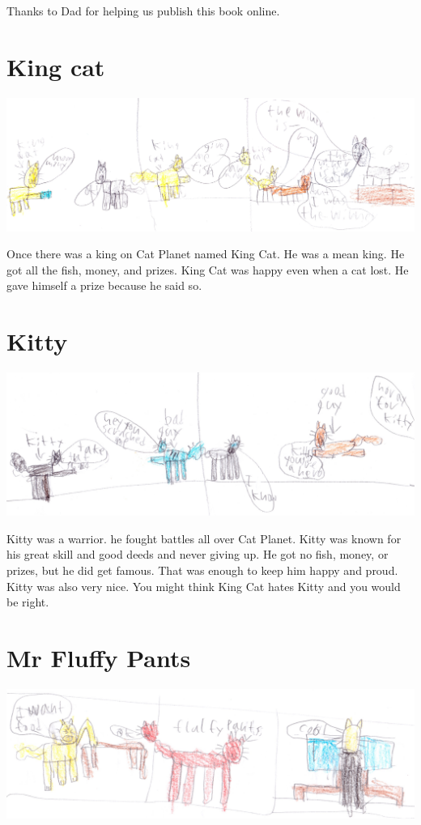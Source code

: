 \documentclass[12pt,oneside]{krantz}
\begin{document}
Thanks to Dad for helping us publish this book online.

\hypertarget{king-cat}{%
\chapter{King cat}\label{king-cat}}

\includegraphics{img/thewinner.jpg}

Once there was a king on Cat Planet named King Cat. He was a mean king.
He got all the fish, money, and prizes. King Cat was happy even when a
cat lost. He gave himself a prize because he said so.

\hypertarget{kitty}{%
\chapter{Kitty}\label{kitty}}

\includegraphics{img/kittyhero.jpg}

Kitty was a warrior. he fought battles all over Cat Planet. Kitty was
known for his great skill and good deeds and never giving up. He got no
fish, money, or prizes, but he did get famous. That was enough to keep
him happy and proud. Kitty was also very nice. You might think King Cat
hates Kitty and you would be right.

\hypertarget{mr-fluffy-pants}{%
\chapter{Mr Fluffy Pants}\label{mr-fluffy-pants}}

\includegraphics{img/fluffypants.jpg}
\end{document}
